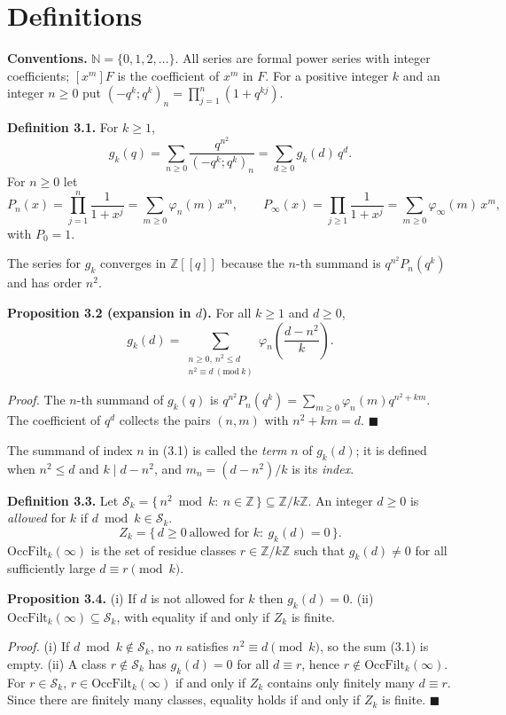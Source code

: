 \section{Definitions}\label{definitions}

\textbf{Conventions.} \(\mathbb{N}=\{0,1,2,\dots\}\). All series are formal power series with integer coefficients; \([x^m]F\) is the coefficient of \(x^m\) in \(F\). For a positive integer \(k\) and an integer \(n\ge0\) put \((-q^k;q^k)_n=\prod_{j=1}^{n}(1+q^{kj})\).

\textbf{Definition 3.1.} For \(k\ge1\),
\[g_k(q)=\sum_{n\ge0}\frac{q^{n^2}}{(-q^k;q^k)_n}=\sum_{d\ge0}g_k(d)\,q^d .\]
For \(n\ge0\) let
\[P_n(x)=\prod_{j=1}^{n}\frac{1}{1+x^{j}}=\sum_{m\ge0}\varphi_n(m)\,x^m,\qquad P_\infty(x)=\prod_{j\ge1}\frac{1}{1+x^{j}}=\sum_{m\ge0}\varphi_\infty(m)\,x^m ,\]
with \(P_0=1\).

The series for \(g_k\) converges in \(\mathbb{Z}[[q]]\) because the \(n\)-th summand is \(q^{n^2}P_n(q^k)\) and has order \(n^2\).

\textbf{Proposition 3.2 (expansion in \(d\)).} For all \(k\ge1\) and \(d\ge0\),
\[g_k(d)=\sum_{\substack{n\ge0,\ n^2\le d\\ n^2\equiv d\ (\mathrm{mod}\ k)}}\varphi_n\!\left(\frac{d-n^2}{k}\right).\tag{3.1}\]

\emph{Proof.} The \(n\)-th summand of \(g_k(q)\) is \(q^{n^2}P_n(q^k)=\sum_{m\ge0}\varphi_n(m)q^{n^2+km}\). The coefficient of \(q^d\) collects the pairs \((n,m)\) with \(n^2+km=d\). \(\blacksquare\)

The summand of index \(n\) in (3.1) is called the \emph{term} \(n\) of \(g_k(d)\); it is defined when \(n^2\le d\) and \(k\mid d-n^2\), and \(m_n=(d-n^2)/k\) is its \emph{index}.

\textbf{Definition 3.3.} Let \(\mathcal S_k=\{\,n^2 \bmod k:\ n\in\mathbb{Z}\,\}\subseteq\mathbb{Z}/k\mathbb{Z}\). An integer \(d\ge0\) is \emph{allowed} for \(k\) if \(d \bmod k\in\mathcal S_k\).
\[Z_k=\{\,d\ge0\ \text{allowed for }k:\ g_k(d)=0\,\}.\]
\(\mathrm{OccFilt}_k(\infty)\) is the set of residue classes \(r\in\mathbb{Z}/k\mathbb{Z}\) such that \(g_k(d)\ne0\) for all sufficiently large \(d\equiv r \pmod k\).

\textbf{Proposition 3.4.} (i) If \(d\) is not allowed for \(k\) then \(g_k(d)=0\). (ii) \(\mathrm{OccFilt}_k(\infty)\subseteq\mathcal S_k\), with equality if and only if \(Z_k\) is finite.

\emph{Proof.} (i) If \(d\bmod k\notin\mathcal S_k\), no \(n\) satisfies \(n^2\equiv d\pmod k\), so the sum (3.1) is empty. (ii) A class \(r\notin\mathcal S_k\) has \(g_k(d)=0\) for all \(d\equiv r\), hence \(r\notin\mathrm{OccFilt}_k(\infty)\). For \(r\in\mathcal S_k\), \(r\in\mathrm{OccFilt}_k(\infty)\) if and only if \(Z_k\) contains only finitely many \(d\equiv r\). Since there are finitely many classes, equality holds if and only if \(Z_k\) is finite. \(\blacksquare\)

